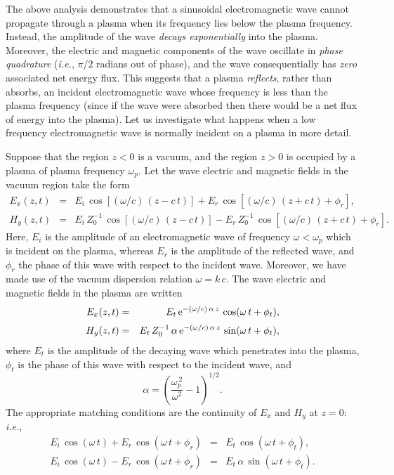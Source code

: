 The above analysis demonstrates  that a sinusoidal electromagnetic wave cannot propagate through a plasma when its frequency lies below the plasma frequency. Instead, the amplitude of the wave {\em decays exponentially}\/
into the plasma. Moreover, the electric and magnetic components of the
wave oscillate in {\em phase quadrature}\/ ({\em i.e.}, $\pi/2$ radians out of phase), and
the wave consequentially has {\em zero}\/ associated net energy flux. This suggests that a
plasma {\em reflects}, rather than {\rm absorbs}, an incident electromagnetic wave whose frequency is less than the plasma frequency (since if the wave were absorbed
then there would be a net flux of energy into the plasma). Let us investigate what happens
when a low frequency electromagnetic wave is normally incident on a plasma in more detail.

Suppose that the region $z<0$ is a vacuum, and the region $z>0$ is
occupied by a plasma of plasma frequency $\omega_p$. Let the wave electric and
magnetic fields in the vacuum region take the form
\begin{eqnarray}\label{e9.41}
E_x(z,t) &=& E_i\,\cos[(\omega/c)\,(z-c\,t)] + E_r\,\cos[(\omega/c)\,(z+c\,t)+\phi_r],\\[0.5ex]
H_y(z,t) &=& E_i\,Z_0^{-1}\,\cos[(\omega/c)\,(z-c\,t)] - E_r\,Z_0^{-1}\,\cos[(\omega/c)\,(z+c\,t)+\phi_r].\label{e9.42}
\end{eqnarray}
Here, $E_i$ is the amplitude of an electromagnetic wave of frequency $\omega<\omega_p$ which is incident on the plasma, whereas $E_r$ is the amplitude
of the reflected wave, and $\phi_r$ the phase  of this wave with respect to the
incident wave. Moreover, we have made use of the vacuum dispersion relation $\omega=k\,c$. 
The wave electric and magnetic fields in the plasma are written
\begin{eqnarray}
E_x(z,t) &=& E_t\,{\rm e}^{-(\omega/c)\,\alpha\,z}\,\cos(\omega\,t+\phi_t),\\[0.5ex]
H_y(z,t) &=& E_t\,Z_0^{-1}\,\alpha\,{\rm e}^{-(\omega/c)\,\alpha\,z}\,\sin(\omega\,t+\phi_t),
\end{eqnarray}
where $E_t$ is the amplitude of the decaying wave which penetrates into the
plasma, $\phi_t$ is the phase of this wave with respect to the incident wave,
and
\begin{equation}
\alpha = \left(\frac{\omega_p^{\,2}}{\omega^2}-1\right)^{1/2}.
\end{equation}
The appropriate matching conditions are the continuity of $E_x$ and $H_y$ at $z=0$:
{\em i.e.},
\begin{eqnarray}\label{e9.46}
E_i\,\cos(\omega\,t) + E_r\,\cos(\omega\,t+\phi_r) &=& E_t\,\cos(\omega\,t+\phi_t),\\[0.5ex]
E_i\,\cos(\omega\,t) - E_r\,\cos(\omega\,t+\phi_r) &=& E_t\,\alpha\,\sin(\omega\,t+\phi_t).\label{e9.47}
\end{eqnarray}
